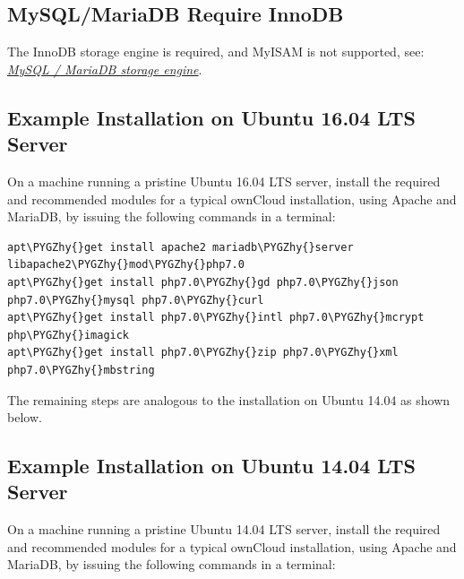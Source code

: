 \documentclass[letterpaper,10pt,english]{sphinxmanual}
\def\PYGZhy{\char`\-}
\begin{document}
\subsection{MySQL/MariaDB Require InnoDB}
\label{installation/source_installation:mysql-mariadb-require-innodb}
The InnoDB storage engine is required, and MyISAM is not supported, see: {\hyperref[configuration_database/linux_database_configuration:db-storage-engine-label]{\emph{MySQL / MariaDB storage engine}}}.


\subsection{Example Installation on Ubuntu 16.04 LTS Server}
\label{installation/source_installation:example-installation-on-ubuntu-16-04-lts-server}\label{installation/source_installation:ubuntu-installation-label}
On a machine running a pristine Ubuntu 16.04 LTS server, install the
required and recommended modules for a typical ownCloud installation, using
Apache and MariaDB, by issuing the following commands in a terminal:

\begin{Verbatim}[commandchars=\\\{\}]
apt\PYGZhy{}get install apache2 mariadb\PYGZhy{}server libapache2\PYGZhy{}mod\PYGZhy{}php7.0
apt\PYGZhy{}get install php7.0\PYGZhy{}gd php7.0\PYGZhy{}json php7.0\PYGZhy{}mysql php7.0\PYGZhy{}curl
apt\PYGZhy{}get install php7.0\PYGZhy{}intl php7.0\PYGZhy{}mcrypt php\PYGZhy{}imagick
apt\PYGZhy{}get install php7.0\PYGZhy{}zip php7.0\PYGZhy{}xml php7.0\PYGZhy{}mbstring
\end{Verbatim}

The remaining steps are analogous to the installation on Ubuntu 14.04 as shown below.


\subsection{Example Installation on Ubuntu 14.04 LTS Server}
\label{installation/source_installation:example-installation-on-ubuntu-14-04-lts-server}
On a machine running a pristine Ubuntu 14.04 LTS server, install the
required and recommended modules for a typical ownCloud installation, using
Apache and MariaDB, by issuing the following commands in a terminal:
\end{document}

